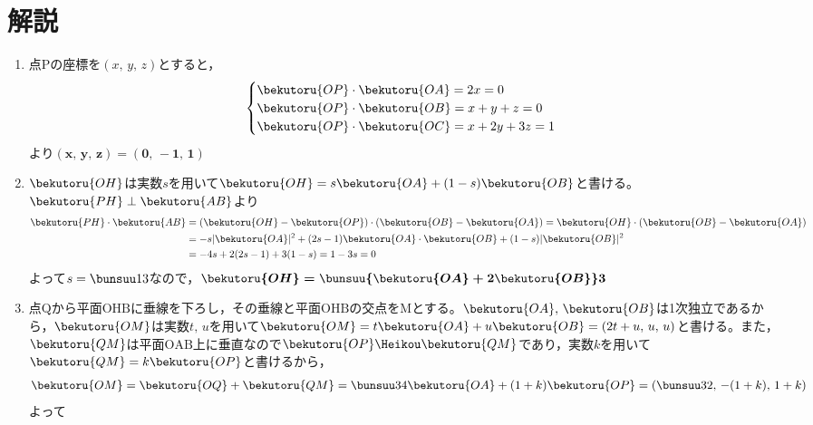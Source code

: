 \documentclass[../../../doc/main]{subfiles}
\begin{document}
    \setcounter{chapter}{4}
    \setcounter{section}{2}
    \section{解説}\label{解説4}
    \begin{enumerate}
        \item [\kakkoichi] 
        点$\mathrm P$の座標を$(x,\,y,\,z)$とすると，
        \begin{align*}
            \begin{cases}
                \bekutoru{OP}\cdot\bekutoru{OA}=2x=0\\
                \bekutoru{OP}\cdot\bekutoru{OB}=x+y+z=0\\
                \bekutoru{OP}\cdot\bekutoru{OC}=x+2y+3z=1
            \end{cases}
        \end{align*}
        より$\boldsymbol{(x,\,y,\,z)=(0,\,-1,\,1)}$\kotae
        \item [\kakkoni] 
        $\bekutoru{OH}$は実数$s$を用いて$\bekutoru{OH}=s\bekutoru{OA}+(1-s)\bekutoru{OB}$と書ける。$\bekutoru{PH}\perp\bekutoru{AB}$より
        \begin{align*}
            \bekutoru{PH}\cdot\bekutoru{AB}&=(\bekutoru{OH}-\bekutoru{OP})\cdot(\bekutoru{OB}-\bekutoru{OA})=\bekutoru{OH}\cdot(\bekutoru{OB}-\bekutoru{OA})\\
            &=-s|\bekutoru{OA}|^2+(2s-1)\bekutoru{OA}\cdot\bekutoru{OB}+(1-s)|\bekutoru{OB}|^2\\
            &=-4s+2(2s-1)+3(1-s)=1-3s=0
        \end{align*}
        よって$s=\bunsuu13$なので，$\boldsymbol{\bekutoru{OH}=\bunsuu{\bekutoru{OA}+2\bekutoru{OB}}3}$\kotae
        \item [\kakkosan] 
        点$\mathrm Q$から平面$\mathrm{OHB}$に垂線を下ろし，その垂線と平面$\mathrm{OHB}$の交点を$\mathrm M$とする。$\bekutoru{OA},\,\bekutoru{OB}$は1次独立であるから，$\bekutoru{OM}$は実数$t,\,u$を用いて$\bekutoru{OM}=t\bekutoru{OA}+u\bekutoru{OB}=(2t+u,\,u,\,u)$と書ける。また，$\bekutoru{QM}$は平面$\mathrm{OAB}$上に垂直なので$\bekutoru{OP}\Heikou\bekutoru{QM}$であり，実数$k$を用いて$\bekutoru{QM}=k\bekutoru{OP}$と書けるから，
        \begin{align*}
            \bekutoru{OM}=\bekutoru{OQ}+\bekutoru{QM}=\bunsuu34\bekutoru{OA}+(1+k)\bekutoru{OP}=\left(\bunsuu32,\,-(1+k),\,1+k\right)
        \end{align*}
        よって
        \begin{align*}

\end{align*}
\end{enumerate}
\end{document}
